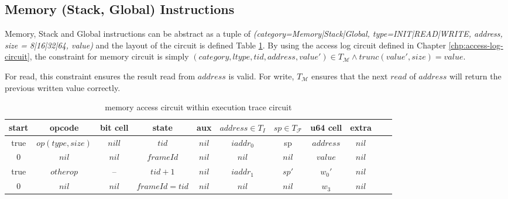 \subsection{Memory (Stack, Global) Instructions}
Memory, Stack and Global instructions can be abstract as a tuple of \emph{(category=Memory|Stack|Global, type=INIT|READ|WRITE, address, size = 8|16|32|64, value)} and the layout of the circuit is defined Table \ref{tbl:memory-instruction}. By using the access log circuit defined in Chapter \ref{chp:access-log-circuit}, the constraint for memory circuit is simply $(category, ltype, tid, address, value') \in T_\mathcal{M} \wedge trunc(value', size) = value$.

\begin{remark}
For read, this constraint ensures the result read from $address$ is valid. For write, $T_\mathcal{M}$ ensures that the next $read$ of $address$ will return the previous written value correctly.
\end{remark}
\begin{table}[!h]
\begin{center}
\begin{tabular}{ | c | c | c | c | c | c | c | c | c | c | c | }
  \hline
  start & opcode & bit cell & state & aux & $address \in T_{I}$ & $sp \in T_\mathcal{F}$& u64 cell & extra \\ 
  \hline
   true & $op(type, size)$ & $nill$ & $tid$ & $nil$ & $iaddr_0$ & sp & $address$ & $nil$\\ 
 \hline
   0 & $nil$ & $nil$ & $frameId$ & $nil$ & $nil$ & $nil$ & $value$ & $nil$\\ 
 \hline
   true & $otherop$ & -- & $tid + 1$ & $nil$ & $iaddr_1$ & $sp'$ & $w_0'$ & $nil$\\
 \hline
   0 & $nil$ & $nil$ & $frameId = tid$ & $nil$ & $nil$ & $nil$ & $w_3$ & $nil$\\ 
 \hline
\end{tabular}
\caption{memory access circuit within execution trace circuit}
\label{tbl:memory-instruction}
\end{center}
\end{table}